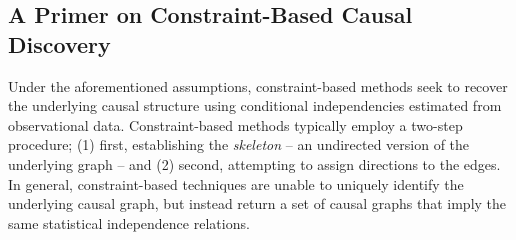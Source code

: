 \documentclass[11pt]{article}
\makeatletter
\newcommand*{\indep}{%
  \mathbin{%
    \mathpalette{\@indep}{}%
  }%
}
\newcommand*{\@indep}[2]{%
  \sbox0{$#1\perp\m@th$}%
  \sbox2{$#1=$}%
  \sbox4{$#1\vcenter{}$}%
  \rlap{\copy0}%
  \dimen@=\dimexpr\ht2-\ht4-.2pt\relax
  \kern\dimen@
  \ifx\\#2\\%
  \else
    \hbox to \wd2{\hss$#1#2\m@th$\hss}%
    \kern-\wd2 %
  \fi
  \kern\dimen@
  \copy0 %
}
\makeatother
\begin{document}


 


\subsection{A Primer on Constraint-Based Causal Discovery} \label{primer}
Under the aforementioned assumptions, constraint-based methods seek to recover the underlying causal structure using conditional independencies estimated from observational data. Constraint-based methods typically employ a two-step procedure; (1) first, establishing the \textit{skeleton} -- an undirected version of the underlying graph -- and (2) second, attempting to assign directions to the edges. In general, constraint-based techniques are unable to uniquely identify the underlying causal graph, but instead return a set of causal graphs that imply the same statistical independence relations.
\end{document}
